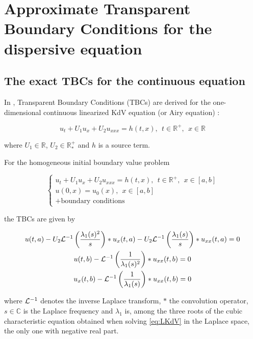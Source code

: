 \section{Approximate Transparent Boundary Conditions for the dispersive equation}
\label{sec:TBC}

\subsection{The exact TBCs for the continuous equation}

\indent In \cite{besse2015}, Transparent Boundary Conditions (TBCs) are derived for the one-dimensional continuous linearized KdV equation (or Airy equation) :

\begin{equation}
 	\label{eq:LKdV}
 	u_t + U_1u_x + U_2u_{xxx} = h(t,x), \ \ t \in \mathbb{R}^+, \ \ x \in \mathbb{R}
\end{equation}

\noindent where $U_1 \in \mathbb{R}$, $U_2 \in \mathbb{R}^+_*$ and $h$ is a source term.

\indent For the homogeneous initial boundary value problem 

\begin{equation*}
\begin{cases}
	u_t + U_1u_x + U_2u_{xxx} = h(t,x), \ \ t \in \mathbb{R}^+, \ \ x \in [a,b] \\
	u(0,x) = u_0(x), \ \ x \in [a,b] \\
	+ \text{boundary conditions} \nonumber
\end{cases}
\end{equation*}

\noindent the TBCs are given \cite[equations 2.17,2.18]{besse2015} by 

\begin{equation}
\label{eq:continuousTBC}
\begin{gathered}
        u(t,a) - U_2 \mathcal{L}^{-1} \left( \frac{\lambda_1(s)^2}{s} \right) * u_x(t,a) - U_2 \mathcal{L}^{-1} \left( \frac{\lambda_1(s)}{s} \right) * u_{xx}(t,a) = 0 \\ 
        u(t,b) - \mathcal{L}^{-1} \left( \frac{1}{\lambda_1(s)^2} \right) * u_{xx}(t,b) = 0 \\
        u_x(t,b) - \mathcal{L}^{-1} \left( \frac{1}{\lambda_1(s)} \right) * u_{xx}(t,b) = 0 
\end{gathered}
\end{equation}

\noindent where $\mathcal{L}^{-1}$ denotes the inverse Laplace transform, $*$ the convolution operator, $s \in \mathbb{C}$ is the Laplace frequency and $\lambda_1$ is, among the three roots of the cubic characteristic equation obtained when solving \eqref{eq:LKdV} in the Laplace space, the only one with negative real part.

